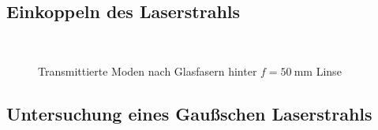 \documentclass[11pt,a4paper,oneside]{scrartcl}
\begin{document}
\subsection{Einkoppeln des Laserstrahls}
\begin{figure}[H]
\setcounter{imEnv}{1}
    \centering
  \\
   \caption{Transmittierte Moden nach Glasfasern hinter $f=50\ \mathrm{mm}$ Linse}
    \label{FotostreckeGlasfasern}
\end{figure}
\subsection{Untersuchung eines Gaußschen Laserstrahls}
\end{document}
